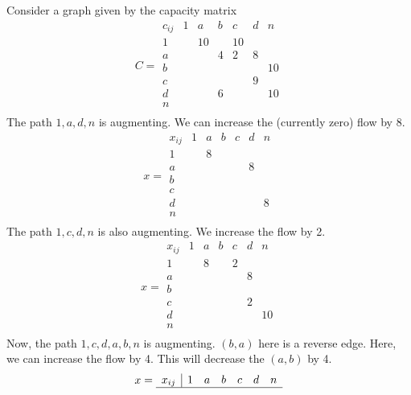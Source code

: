\begin{example}
	Consider a graph given by the capacity matrix
	\[
		C = \begin{array}{c|cccccc}
			c_{ij} & 1 & a  & b & c  & d & n  \\\hline
			1      &   & 10 &   & 10 &   &    \\
			a      &   &    & 4 & 2  & 8 &    \\
			b      &   &    &   &    &   & 10 \\
			c      &   &    &   &    & 9 &    \\
			d      &   &    & 6 &    &   & 10 \\
			n                                 \\
		\end{array}
	\]
	The path \( 1,a,d,n \) is augmenting.
	We can increase the (currently zero) flow by 8.
	\[
		x = \begin{array}{c|cccccc}
			x_{ij} & 1 & a & b & c & d & n \\\hline
			1      &   & 8 &   &   &   &   \\
			a      &   &   &   &   & 8 &   \\
			b      &   &   &   &   &   &   \\
			c      &   &   &   &   &   &   \\
			d      &   &   &   &   &   & 8 \\
			n                              \\
		\end{array}
	\]
	The path \( 1,c,d,n \) is also augmenting.
	We increase the flow by 2.
	\[
		x = \begin{array}{c|cccccc}
			x_{ij} & 1 & a & b & c & d & n  \\\hline
			1      &   & 8 &   & 2 &   &    \\
			a      &   &   &   &   & 8 &    \\
			b      &   &   &   &   &   &    \\
			c      &   &   &   &   & 2 &    \\
			d      &   &   &   &   &   & 10 \\
			n                               \\
		\end{array}
	\]
	Now, the path \( 1,c,d,a,b,n \) is augmenting.
	\( (b,a) \) here is a reverse edge.
	Here, we can increase the flow by 4.
	This will decrease the \( (a,b) \) by 4.
	\[
		x = \begin{array}{c|cccccc}
			x_{ij} & 1 & a & b & c & d & n  \\\hline

\end{array}\]
\end{example}
